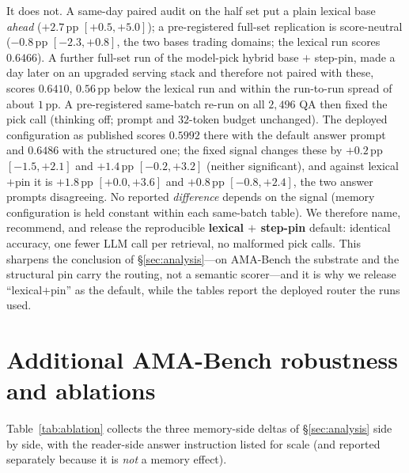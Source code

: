 \documentclass{article} %
\newcommand{\pp}{\,\mathrm{pp}}
\begin{document}
It does not. A same-day paired audit on the half set put a plain lexical base
\emph{ahead} ($+2.7\pp$ $[+0.5,+5.0]$); a pre-registered full-set replication is
score-neutral ($-0.8\pp$ $[-2.3,+0.8]$, the two bases trading domains; the lexical run scores $0.6466$).
A further full-set run of the model-pick hybrid base $+$ step-pin, made a day later on an
upgraded serving stack and therefore not paired with these, scores $0.6410$, $0.56\pp$ below
the lexical run and within the run-to-run spread of about $1\pp$. A pre-registered same-batch re-run on all $2{,}496$ QA then fixed the pick call (thinking off; prompt and $32$-token budget unchanged). The deployed configuration as published scores $0.5992$ there with the default answer prompt and $0.6486$ with the structured one; the fixed signal changes these by $+0.2\pp$ $[-1.5,+2.1]$ and $+1.4\pp$ $[-0.2,+3.2]$ (neither significant), and against lexical$+$pin it is $+1.8\pp$ $[+0.0,+3.6]$ and $+0.8\pp$ $[-0.8,+2.4]$, the two answer prompts disagreeing.
No reported \emph{difference} depends on the signal (memory configuration is
held constant within each same-batch table). We therefore name, recommend, and
release the reproducible \textbf{lexical $+$ step-pin} default: identical accuracy,
one fewer LLM call per retrieval, no malformed pick calls. This sharpens the
conclusion of \S\ref{sec:analysis}---on AMA-Bench the substrate and the structural
pin carry the routing, not a semantic scorer---and it is why we release
``lexical$+$pin'' as the default, while the tables report the deployed router the runs used.

\section{Additional AMA-Bench robustness and ablations}
\label{app:amaextra}

Table~\ref{tab:ablation} collects the three memory-side deltas of \S\ref{sec:analysis}
side by side, with the reader-side answer instruction listed for scale (and reported
separately because it is \emph{not} a memory effect).
\end{document}
